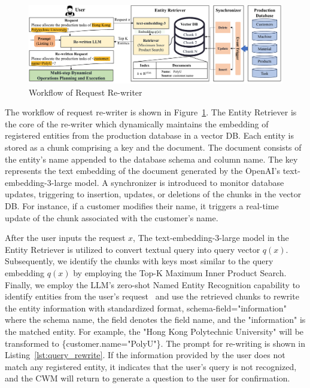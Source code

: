 \documentclass[preprint,12pt]{elsarticle}
\begin{document}
\begin{figure}
    \centering
    \includegraphics[width=\linewidth]{figs/query_rewrite.pdf}
    \caption{Workflow of Request Re-writer}
    \label{fig:tech_request_rewriter}
\end{figure}

The workflow of request re-writer is shown in Figure~\ref{fig:tech_request_rewriter}.
The Entity Retriever is the core of the re-writer which dynamically maintains the embedding of registered entities from the production database in a vector DB.
Each entity is stored as a chunk comprising a key and the document.
The document consists of the entity's name appended to the database schema and column name.
The key represents the text embedding of the document generated by the OpenAI's text-embedding-3-large model.
A synchronizer is introduced to monitor database updates, triggering to insertion, updates, or deletions of the chunks in the vector DB.
For instance, if a customer modifies their name, it triggers a real-time update of the chunk associated with the customer's name.

After the user inputs the request $x$,
The text-embedding-3-large model in the Entity Retriever is utilized to convert textual query into query vector $q(x)$. 
Subsequently, we identify the chunks with keys most similar to the query embedding $q(x)$ by employing the Top-K Maximum Inner Product Search.
Finally, we employ the LLM's zero-shot Named Entity Recognition capability to identify entities from the user's request~\cite{xie2023self} and use the retrieved chunks to rewrite the entity information with standardized format, {schema-field="information"} where the schema name, the field denotes the field name, and the "information" is the matched entity.
For example, the "Hong Kong Polytechnic University" will be transformed to \{customer.name="PolyU"\}.
The prompt for re-writing is shown in Listing~\ref{lst:query_rewrite}.
If the information provided by the user does not match any registered entity, it indicates that the user's query is not recognized, and the CWM will return to generate a question to the user for confirmation.
\end{document}
